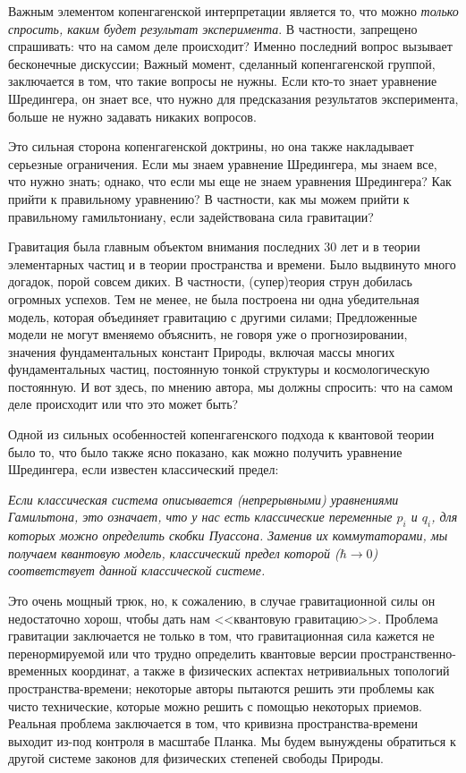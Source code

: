 \documentclass[main.tex]{subfiles}
\begin{document}
Важным элементом копенгагенской интерпретации является то, что можно \textit{только спросить, каким будет результат эксперимента}. В частности, запрещено спрашивать: что на самом деле происходит? Именно последний вопрос вызывает бесконечные дискуссии; Важный момент, сделанный копенгагенской группой, заключается в том, что такие вопросы не нужны. Если кто-то знает уравнение Шредингера, он знает все, что нужно для предсказания результатов эксперимента, больше не нужно задавать никаких вопросов.

Это сильная сторона копенгагенской доктрины, но она также накладывает серьезные ограничения. Если мы знаем уравнение Шредингера, мы знаем все, что нужно знать; однако, что если мы еще не знаем уравнения Шредингера? Как прийти к правильному уравнению? В частности, как мы можем прийти к правильному гамильтониану, если задействована сила гравитации?

Гравитация была главным объектом внимания последних 30 лет и в теории элементарных частиц и в теории пространства и времени. Было выдвинуто много догадок, порой совсем диких. В частности, (супер)теория струн добилась огромных успехов. Тем не менее, не была построена ни одна убедительная модель, которая объединяет гравитацию с другими силами; Предложенные модели не могут вменяемо объяснить, не говоря уже о прогнозировании, значения фундаментальных констант Природы, включая массы многих фундаментальных частиц, постоянную тонкой структуры и космологическую постоянную. И вот здесь, по мнению автора, мы должны спросить: что на самом деле происходит или что это может быть?

Одной из сильных особенностей копенгагенского подхода к квантовой теории было то, что было также ясно показано, как можно получить уравнение Шредингера, если известен классический предел:

\textit{Если классическая система описывается (непрерывными) уравнениями Гамильтона, это означает, что у нас есть классические переменные $p_i$ и $q_i$, для которых можно определить скобки Пуассона. Заменив их коммутаторами, мы получаем квантовую модель, классический предел которой ($\hbar\rightarrow 0$) соответствует данной классической системе.}

Это очень мощный трюк, но, к сожалению, в случае гравитационной силы он недостаточно хорош, чтобы дать нам <<квантовую гравитацию>>. Проблема гравитации заключается не только в том, что гравитационная сила кажется не перенормируемой или что трудно определить квантовые версии пространственно-временных координат, а также в физических аспектах нетривиальных топологий пространства-времени; некоторые авторы пытаются решить эти проблемы как чисто технические, которые можно решить с помощью некоторых приемов. Реальная проблема заключается в том, что кривизна пространства-времени выходит из-под контроля в масштабе Планка. Мы будем вынуждены обратиться к другой системе законов для физических степеней свободы Природы.
\end{document}
